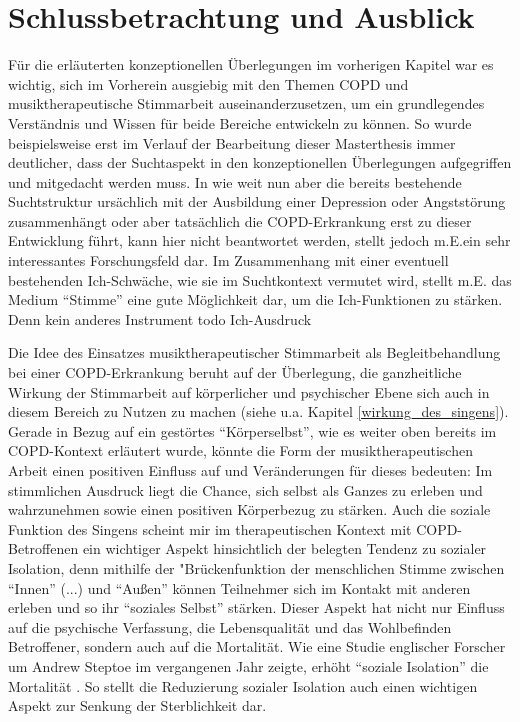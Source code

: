 \chapter{Schlussbetrachtung und Ausblick} %
Für die erläuterten konzeptionellen Überlegungen im vorherigen Kapitel war es wichtig, sich im Vorherein ausgiebig mit den Themen COPD und musiktherapeutische Stimmarbeit auseinanderzusetzen, um ein grundlegendes Verständnis und Wissen für beide Bereiche entwickeln zu können. So wurde beispielsweise erst im Verlauf der Bearbeitung dieser Masterthesis immer deutlicher, dass der Suchtaspekt in den konzeptionellen Überlegungen aufgegriffen und mitgedacht werden muss. In wie weit nun aber die bereits bestehende Suchtstruktur ursächlich mit der Ausbildung einer Depression oder Angststörung zusammenhängt oder aber tatsächlich die COPD-Erkrankung erst zu dieser Entwicklung führt, kann hier nicht beantwortet werden, stellt jedoch m.E.ein sehr interessantes Forschungsfeld dar. Im Zusammenhang mit einer eventuell bestehenden Ich-Schwäche, wie sie im Suchtkontext vermutet wird, stellt m.E. das Medium "`Stimme"' eine gute Möglichkeit dar, um die Ich-Funktionen zu stärken. Denn kein anderes Instrument todo Ich-Ausdruck

Die Idee des Einsatzes musiktherapeutischer Stimmarbeit als Begleitbehandlung bei einer COPD-Erkrankung beruht auf der Überlegung, die ganzheitliche Wirkung der Stimmarbeit auf körperlicher und psychischer Ebene sich auch in diesem Bereich zu Nutzen zu machen (siehe u.a. Kapitel \ref{wirkung_des_singens}). Gerade in Bezug auf ein gestörtes "`Körperselbst"', wie es weiter oben bereits im COPD-Kontext erläutert wurde, könnte die Form der musiktherapeutischen Arbeit einen positiven Einfluss auf und Veränderungen für dieses bedeuten: Im stimmlichen Ausdruck liegt die Chance, sich selbst als Ganzes zu erleben und wahrzunehmen sowie einen positiven Körperbezug zu stärken. Auch die soziale Funktion des Singens scheint mir im therapeutischen Kontext mit COPD-Betroffenen ein wichtiger Aspekt hinsichtlich der belegten Tendenz zu sozialer Isolation, denn mithilfe der "Brückenfunktion der menschlichen Stimme zwischen "`Innen"' (...) und "`Außen"' können Teilnehmer sich im Kontakt mit anderen erleben und so ihr "`soziales Selbst"' stärken. Dieser Aspekt hat nicht nur Einfluss auf die psychische Verfassung, die Lebensqualität und das Wohlbefinden Betroffener, sondern auch auf die Mortalität. Wie eine Studie englischer Forscher um Andrew Steptoe im vergangenen Jahr zeigte, erhöht "`soziale Isolation"' die Mortalität \autocite[vgl.][]{pmid23530191}. So stellt die Reduzierung sozialer Isolation auch einen wichtigen Aspekt zur Senkung der Sterblichkeit dar.


